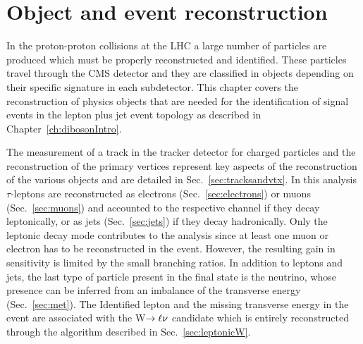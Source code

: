 \chapter{Object and event reconstruction}
\label{ch:EventReconstruction}

In the proton-proton collisions at the LHC a large number of particles are produced which must be properly reconstructed and identified. These particles travel through the CMS detector and they are classified in objects depending on their specific signature in each subdetector. This chapter covers the reconstruction of physics objects that are needed for the identification of signal events in the lepton plus jet event topology as described in Chapter~\ref{ch:dibosonIntro}.

The measurement of a track in the tracker detector for charged particles and the reconstruction of the primary vertices represent key aspects of the reconstruction of the various objects and are detailed in Sec.~\ref{sec:tracksandvtx}. In this analysis $\tau$-leptons are reconstructed as electrons (Sec.~\ref{sec:electrons}) or muons (Sec.~\ref{sec:muons}) and accounted to the respective channel if they decay leptonically, or as jets (Sec.~\ref{sec:jets}) if they decay hadronically. Only the leptonic decay mode contributes to the analysis since at least one muon or electron has to be reconstructed in the event. However, the resulting gain in sensitivity is limited by the small branching ratios. In addition to leptons and jets, the last type of particle present in the final state is the neutrino, whose presence can be inferred from an imbalance of the transverse energy (Sec.~\ref{sec:met}). The Identified lepton and the missing transverse energy in the event are associated with the W$\rightarrow\ell\nu$ candidate which is entirely reconstructed through the algorithm described in Sec.~\ref{sec:leptonicW}.


 
 
 
 
